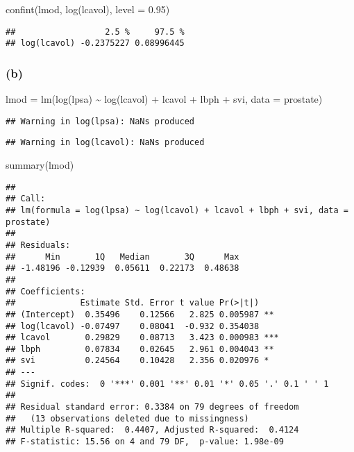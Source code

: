 \documentclass[
]{article}
\newenvironment{Shaded}{\begin{snugshade}}{\end{snugshade}}
\newcommand{\AttributeTok}[1]{\textcolor[rgb]{0.77,0.63,0.00}{#1}}
\newcommand{\FloatTok}[1]{\textcolor[rgb]{0.00,0.00,0.81}{#1}}
\newcommand{\FunctionTok}[1]{\textcolor[rgb]{0.00,0.00,0.00}{#1}}
\newcommand{\NormalTok}[1]{#1}
\newcommand{\OtherTok}[1]{\textcolor[rgb]{0.56,0.35,0.01}{#1}}
\newcommand{\SpecialCharTok}[1]{\textcolor[rgb]{0.00,0.00,0.00}{#1}}
\newcommand{\StringTok}[1]{\textcolor[rgb]{0.31,0.60,0.02}{#1}}
\begin{document}
\begin{Shaded}
\begin{Highlighting}[]
\FunctionTok{confint}\NormalTok{(lmod, }\StringTok{\textquotesingle{}log(lcavol)\textquotesingle{}}\NormalTok{, }\AttributeTok{level =} \FloatTok{0.95}\NormalTok{)}
\end{Highlighting}
\end{Shaded}

\begin{verbatim}
##                  2.5 %     97.5 %
## log(lcavol) -0.2375227 0.08996445
\end{verbatim}

\hypertarget{b-4}{%
\subsubsection{(b)}\label{b-4}}

\begin{Shaded}
\begin{Highlighting}[]
\NormalTok{lmod }\OtherTok{=} \FunctionTok{lm}\NormalTok{(}\FunctionTok{log}\NormalTok{(lpsa) }\SpecialCharTok{\textasciitilde{}} \FunctionTok{log}\NormalTok{(lcavol) }\SpecialCharTok{+}\NormalTok{ lcavol }\SpecialCharTok{+}\NormalTok{ lbph }\SpecialCharTok{+}\NormalTok{ svi, }\AttributeTok{data =}\NormalTok{ prostate)}
\end{Highlighting}
\end{Shaded}

\begin{verbatim}
## Warning in log(lpsa): NaNs produced
\end{verbatim}

\begin{verbatim}
## Warning in log(lcavol): NaNs produced
\end{verbatim}

\begin{Shaded}
\begin{Highlighting}[]
\FunctionTok{summary}\NormalTok{(lmod)}
\end{Highlighting}
\end{Shaded}

\begin{verbatim}
## 
## Call:
## lm(formula = log(lpsa) ~ log(lcavol) + lcavol + lbph + svi, data = prostate)
## 
## Residuals:
##      Min       1Q   Median       3Q      Max 
## -1.48196 -0.12939  0.05611  0.22173  0.48638 
## 
## Coefficients:
##             Estimate Std. Error t value Pr(>|t|)    
## (Intercept)  0.35496    0.12566   2.825 0.005987 ** 
## log(lcavol) -0.07497    0.08041  -0.932 0.354038    
## lcavol       0.29829    0.08713   3.423 0.000983 ***
## lbph         0.07834    0.02645   2.961 0.004043 ** 
## svi          0.24564    0.10428   2.356 0.020976 *  
## ---
## Signif. codes:  0 '***' 0.001 '**' 0.01 '*' 0.05 '.' 0.1 ' ' 1
## 
## Residual standard error: 0.3384 on 79 degrees of freedom
##   (13 observations deleted due to missingness)
## Multiple R-squared:  0.4407, Adjusted R-squared:  0.4124 
## F-statistic: 15.56 on 4 and 79 DF,  p-value: 1.98e-09
\end{verbatim}
\end{document}
